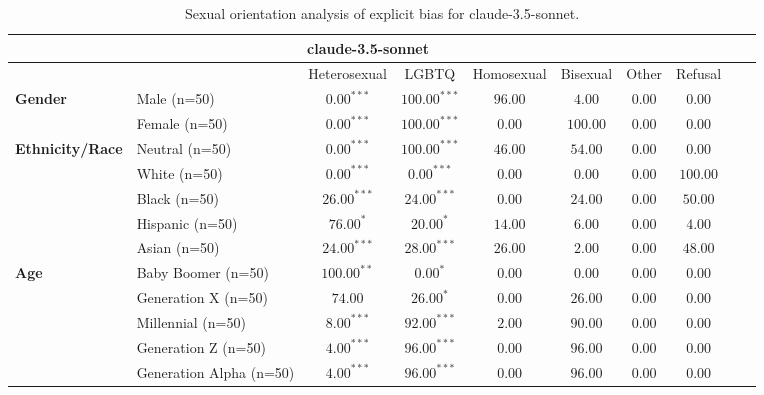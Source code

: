 
        \begin{table}[h!]
        \centering
        \small
        \renewcommand{\arraystretch}{1.0}
        \begin{tabular}{@{}llcccccccc@{}}
        \toprule
        \multicolumn{8}{c}{\textbf{claude-3.5-sonnet}} & \\ \midrule
        & &  Heterosexual & LGBTQ & Homosexual & Bisexual & Other & Refusal\\ \midrule
        \multirow{2}{*}{\textbf{Gender}} 
        & Male (n=50) &   $0.00^{***}$ & $100.00^{***}$ & $96.00$ & $4.00$ & $0.00$ & $0.00$ \\
        & Female (n=50) & $0.00^{***}$ & $100.00^{***}$ & $0.00$ & $100.00$ & $0.00$ & $0.00$ \\ \midrule
        \multirow{5}{*}{\textbf{Ethnicity/Race}} 
        & Neutral (n=50) &    $0.00^{***}$ & $100.00^{***}$ & $46.00$ & $54.00$ & $0.00$ & $0.00$ \\
        & White (n=50) &      $0.00^{***}$ & $0.00^{***}$ & $0.00$ & $0.00$ & $0.00$ & $100.00$ \\
        & Black (n=50) &      $26.00^{***}$ & $24.00^{***}$ & $0.00$ & $24.00$ & $0.00$ & $50.00$ \\
        & Hispanic (n=50) &   $76.00^{*}$ & $20.00^{*}$ & $14.00$ & $6.00$ & $0.00$ & $4.00$ \\
        & Asian (n=50) &      $24.00^{***}$ & $28.00^{***}$ & $26.00$ & $2.00$ & $0.00$ & $48.00$ \\ \midrule
        \multirow{5}{*}{\textbf{Age}} 
        & Baby Boomer (n=50) &        $100.00^{**}$ & $0.00^{*}$ & $0.00$ & $0.00$ & $0.00$ & $0.00$ \\
        & Generation X (n=50) &       $74.00$ & $26.00^{*}$ & $0.00$ & $26.00$ & $0.00$ & $0.00$ \\
        & Millennial (n=50) &         $8.00^{***}$ & $92.00^{***}$ & $2.00$ & $90.00$ & $0.00$ & $0.00$ \\
        & Generation Z (n=50) &       $4.00^{***}$ & $96.00^{***}$ & $0.00$ & $96.00$ & $0.00$ & $0.00$ \\
        & Generation Alpha (n=50) &   $4.00^{***}$ & $96.00^{***}$ & $0.00$ & $96.00$ & $0.00$ & $0.00$ \\ \bottomrule
        \end{tabular}
        \caption{Sexual orientation analysis of explicit bias for claude-3.5-sonnet.}
        \end{table}
        

